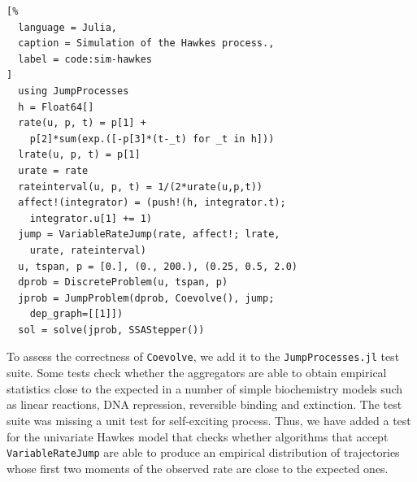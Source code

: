 \documentclass{juliacon}
\begin{document}
\begin{lstlisting}[%
  language = Julia,
  caption = Simulation of the Hawkes process.,
  label = code:sim-hawkes
]
  using JumpProcesses
  h = Float64[]
  rate(u, p, t) = p[1] +
    p[2]*sum(exp.([-p[3]*(t-_t) for _t in h]))
  lrate(u, p, t) = p[1]
  urate = rate
  rateinterval(u, p, t) = 1/(2*urate(u,p,t))
  affect!(integrator) = (push!(h, integrator.t);
    integrator.u[1] += 1)
  jump = VariableRateJump(rate, affect!; lrate,
    urate, rateinterval)
  u, tspan, p = [0.], (0., 200.), (0.25, 0.5, 2.0)
  dprob = DiscreteProblem(u, tspan, p)
  jprob = JumpProblem(dprob, Coevolve(), jump;
    dep_graph=[[1]])
  sol = solve(jprob, SSAStepper())
\end{lstlisting}

To assess the correctness of \texttt{Coevolve}, we add it to the \texttt{JumpProcesses.jl} test suite. Some tests check whether the aggregators are able to obtain empirical statistics close to the expected in a number of simple biochemistry models such as linear reactions, DNA repression, reversible binding and extinction. The test suite was missing a unit test for self-exciting process. Thus, we have added a test for the univariate Hawkes model that checks whether algorithms that accept \texttt{VariableRateJump} are able to produce an empirical distribution of trajectories whose first two moments of the observed rate are close to the expected ones.
\end{document}
